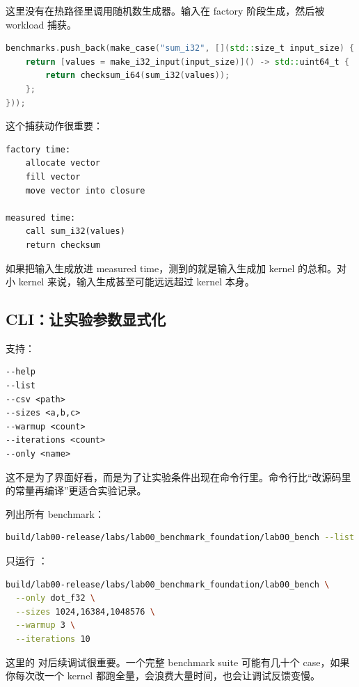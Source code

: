 这里没有在热路径里调用随机数生成器。输入在 factory 阶段生成，然后被 workload 捕获。

\begin{lstlisting}[language=C++]
benchmarks.push_back(make_case("sum_i32", [](std::size_t input_size) {
    return [values = make_i32_input(input_size)]() -> std::uint64_t {
        return checksum_i64(sum_i32(values));
    };
}));
\end{lstlisting}

这个捕获动作很重要：

\begin{lstlisting}
factory time:
    allocate vector
    fill vector
    move vector into closure

measured time:
    call sum_i32(values)
    return checksum
\end{lstlisting}

如果把输入生成放进 measured time，测到的就是输入生成加 kernel 的总和。对小 kernel 来说，输入生成甚至可能远远超过 kernel 本身。

\subsection{CLI：让实验参数显式化}

 支持：

\begin{lstlisting}
--help
--list
--csv <path>
--sizes <a,b,c>
--warmup <count>
--iterations <count>
--only <name>
\end{lstlisting}

这不是为了界面好看，而是为了让实验条件出现在命令行里。命令行比“改源码里的常量再编译”更适合实验记录。

列出所有 benchmark：

\begin{lstlisting}[language=bash]
build/lab00-release/labs/lab00_benchmark_foundation/lab00_bench --list
\end{lstlisting}

只运行 ：

\begin{lstlisting}[language=bash]
build/lab00-release/labs/lab00_benchmark_foundation/lab00_bench \
  --only dot_f32 \
  --sizes 1024,16384,1048576 \
  --warmup 3 \
  --iterations 10
\end{lstlisting}

这里的  对后续调试很重要。一个完整 benchmark suite 可能有几十个 case，如果你每次改一个 kernel 都跑全量，会浪费大量时间，也会让调试反馈变慢。

